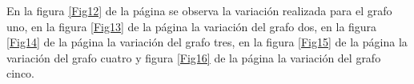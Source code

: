 \documentclass{article}
\begin{document}
En la figura \ref{Fig12} de la página \pageref{Fig12} se observa la variación realizada para el grafo uno, en la figura \ref{Fig13} de la página \pageref{Fig13} la variación del grafo dos, en la figura \ref{Fig14} de la página \pageref{Fig14} la variación del grafo tres, en la figura \ref{Fig15} de la página \pageref{Fig15} la variación del grafo cuatro y figura \ref{Fig16} de la página \pageref{Fig16} la variación del grafo cinco.  

\begin{figure}[htbp]

\end{figure}
\end{document}
